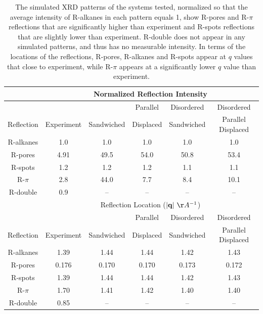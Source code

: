 \documentclass[journal=jpcbfk,manuscript=article]{achemso}
\begin{document}
\begin{table}[h]
  \centering
  \begin{tabular}{c|ccccc}
  \toprule
 		     & \multicolumn{5}{c}{Normalized Reflection Intensity}                   \\
  \hline
             &            &            & Parallel  & Disordered & Disordered         \\
  Reflection & Experiment & Sandwiched & Displaced & Sandwiched & Parallel Displaced \\
  \midrule
  R-alkanes  & 1.0        &  1.0       &  1.0      &  1.0       &  1.0               \\
  R-pores    & 4.91       & 49.5       & 54.0      & 50.8       & 53.4               \\
  R-spots    & 1.2        &  1.2       &  1.2      &  1.1       &  1.1               \\
  R-$\pi$    & 2.8        & 44.0       &  7.7      &  8.4       & 10.1               \\
  R-double   & 0.9        &  --        & --        &  --        & --                 \\ 
  \hline
   		     & \multicolumn{5}{c}{Reflection Location ($|\mathbf{q}|~\AA^{-1}$)}     \\
  \hline
             &            &            & Parallel  & Disordered & Disordered         \\
  Reflection & Experiment & Sandwiched & Displaced & Sandwiched & Parallel Displaced \\
  \midrule
  R-alkanes  & 1.39       &  1.44      &  1.44     & 1.42       & 1.43               \\  
  R-pores    & 0.176      &  0.170     &  0.170    & 0.173      & 0.172              \\
  R-spots    & 1.39       &  1.44      &  1.44     & 1.42       & 1.43               \\
  R-$\pi$    & 1.70       &  1.41      &  1.42     & 1.40       & 1.40               \\
  R-double   & 0.85       &  --        & --        &  --        & --                 \\ 
  \bottomrule
  \end{tabular}
    \caption{The simulated XRD patterns of the systems tested, normalized so that
	  the average intensity of R-alkanes in each pattern equals 1, show R-pores and
	  R-$\pi$ reflections that are significantly higher than experiment and R-spots
	  reflections that are slightly lower than experiment. R-double does not appear
	  in any simulated patterns, and thus has no measurable intensity. In terms of 
	  the locations of the reflections, R-pores, R-alkanes and R-spots appear at $q$
	  values that close to experiment, while R-$\pi$ appears at a significantly lower
	  $q$ value than experiment.\label{table:relative_intensities_300K}}
  \end{table}  
  
\end{document}
